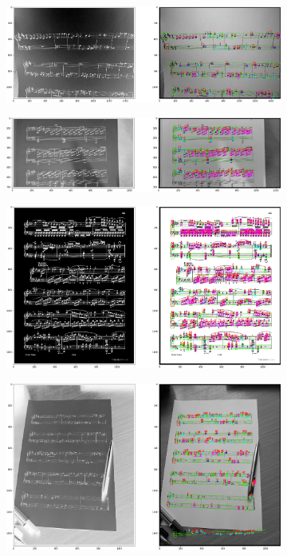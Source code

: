 \documentclass[12pt]{article}
\begin{document}
\begin{enumerate}
\begin{figure}[h!]
\begin{subfigure}[b]{0.48\linewidth}
				\end{subfigure}
				\begin{subfigure}[b]{0.48\linewidth}
					\includegraphics[width=\linewidth]{Medium/Zdj6.png}
				\end{subfigure}
				\begin{subfigure}[b]{0.48\linewidth}
					\includegraphics[width=\linewidth]{Medium/Zdj7.png}
				\end{subfigure}
				\begin{subfigure}[b]{0.48\linewidth}
					\includegraphics[width=\linewidth]{Medium/Zdj8.png}
				\end{subfigure}
				\begin{subfigure}[b]{0.48\linewidth}
					\includegraphics[width=\linewidth]{Medium/Zdj9.png}

\end{subfigure}
\end{figure}
\end{enumerate}
\end{document}
